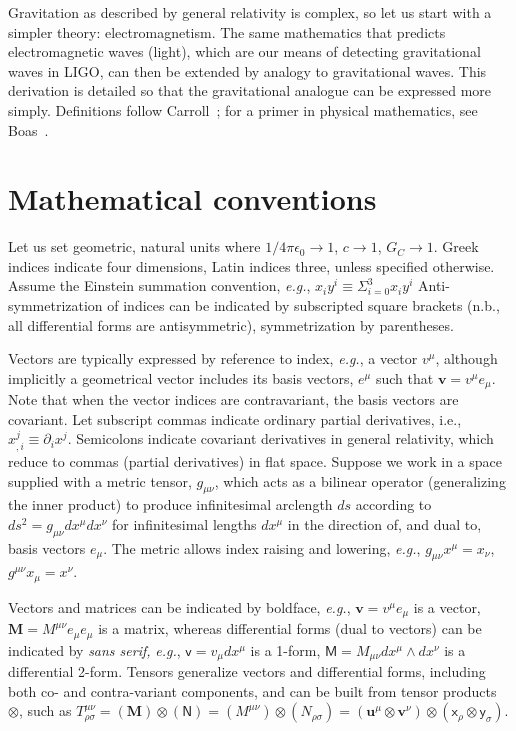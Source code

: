 \label{field_curvature_math}
    
    Gravitation as described by general relativity is complex, so let us start with a simpler theory: electromagnetism. 
The same mathematics that predicts electromagnetic waves (light), which are our means of detecting gravitational waves in LIGO, can then be extended by analogy to gravitational waves.
This derivation is detailed so that the gravitational analogue can be expressed more simply.
Definitions follow Carroll~\cite{Carroll1997}; for a primer in physical mathematics, see Boas~\cite{Boas}.

\section{Mathematical conventions}

    Let us set geometric, natural units where $1/4\pi\epsilon_0 \rightarrow 1$, $c \rightarrow 1$, $G_C \rightarrow 1$. 
Greek indices indicate four dimensions, Latin indices three, unless specified otherwise.
Assume the Einstein summation convention, \textit{e.g.}, $x_i y^i \equiv \Sigma_{i=0}^3 x_i y^i$
Anti-symmetrization of indices can be indicated by subscripted square brackets (n.b., all differential forms are antisymmetric), symmetrization by parentheses.

Vectors are typically expressed by reference to index, \textit{e.g.}, a vector $v^\mu$, although implicitly a geometrical vector includes its basis vectors, $e^\mu$ such that $\textbf{v} = v^\mu e_\mu$.
Note that when the vector indices are contravariant, the basis vectors are covariant.
Let subscript commas indicate ordinary partial derivatives, i.e., $x_{,i}^j \equiv \partial_i x^j$.
Semicolons indicate covariant derivatives in general relativity, which reduce to commas (partial derivatives) in flat space. 
Suppose we work in a space supplied with a metric tensor, $g_{\mu\nu}$, which acts as a bilinear operator (generalizing the inner product) to produce infinitesimal arclength $ds$ according to $ds^2 = g_{\mu \nu} dx^\mu dx^\nu$ for infinitesimal lengths $dx^\mu$ in the direction of, and dual to, basis vectors $e_\mu$. 
The metric allows index raising and lowering, \textit{e.g.}, $g_{\mu \nu} x^\mu = x_\nu$, $g^{\mu \nu} x_\mu = x^\nu$.

Vectors and matrices can be indicated by boldface, \textit{e.g.}, $\textbf{v} = v^\mu e_\mu$ is a vector, $\textbf{M} = M^{\mu\nu} e_\mu e_\mu $ is a matrix, whereas differential forms (dual to vectors) can be indicated by \textit{sans serif,} \textit{e.g.}, $\textsf{v} = v_\mu dx^\mu$ is a 1-form, $\textsf{M} = M_{\mu\nu} dx^\mu \wedge dx^\nu$ is a differential 2-form.
Tensors generalize vectors and differential forms, including both co- and contra-variant components, and can be built from tensor products $\otimes$, such as $T^{\mu\nu}_{\rho\sigma} = (\textbf{M})\otimes (\textsf{N}) = (M^{\mu\nu}) \otimes (N_{\rho\sigma})= (\textbf{u}^\mu \otimes \textbf{v}^\nu) \otimes (\textsf{x}_\rho \otimes \textsf{y}_\sigma)$.

